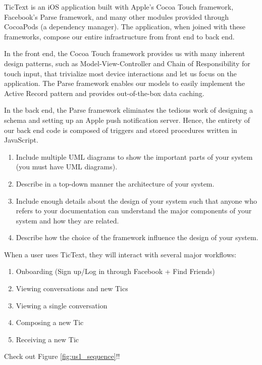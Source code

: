 TicText is an iOS application built with Apple's Cocoa Touch framework, Facebook's Parse framework, and many other modules provided through CocoaPods (a dependency manager). The application, when joined with these frameworks, compose our entire infrastructure from front end to back end.

In the front end, the Cocoa Touch framework provides us with many inherent design patterns, such as Model-View-Controller and Chain of Responsibility for touch input, that trivialize most device interactions and let us focus on the application. The Parse framework enables our models to easily implement the Active Record pattern and provides out-of-the-box data caching.

In the back end, the Parse framework eliminates the tedious work of designing a schema and setting up an Apple push notification server. Hence, the entirety of our back end code is composed of triggers and stored procedures written in JavaScript.

\begin{enumerate}
	\item Include multiple UML diagrams to show the important parts of your system (you must have UML diagrams).
	\item Describe in a top-down manner the architecture of your system.
	\item Include enough details about the design of your system such that anyone who refers to your documentation can understand the major components of your system and how they are related.
	\item Describe how the choice of the framework influence the design of your system.
\end{enumerate}

\noindent When a user uses TicText, they will interact with several major workflows:
\begin{enumerate}
	\item Onboarding (Sign up/Log in through Facebook + Find Friends)
	\item Viewing conversations and new Tics
	\item Viewing a single conversation
	\item Composing a new Tic
	\item Receiving a new Tic
\end{enumerate}

Check out Figure \ref{fig:us1_sequence}!!

\renewcommand\listfigurename{List of Diagrams}
\listoffigures


